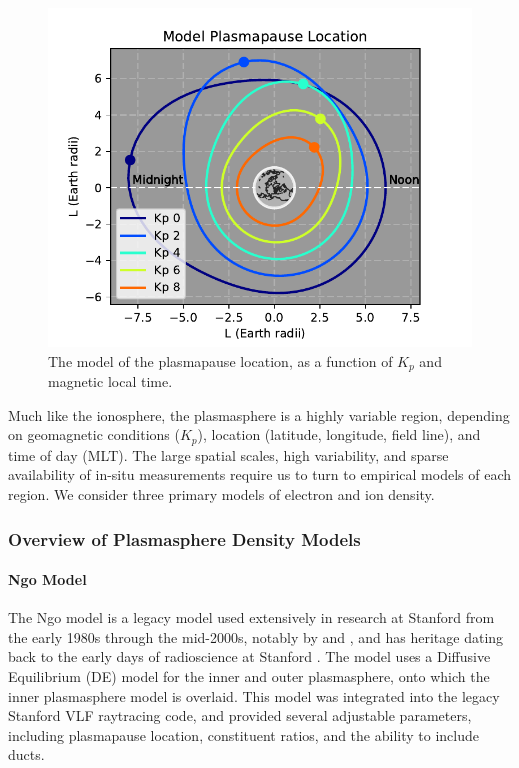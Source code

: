 \begin{figure}[h]
\begin{center}
\includegraphics{figures/plasmapause}
\caption[Model of plasmapause location]{The \cite{Gallagher1999} model of the plasmapause location, as a function of $K_p$ and magnetic local time.}
\label{fig:plasmapause}
\end{center}
\end{figure}


Much like the ionosphere, the plasmasphere is a highly variable region, depending on geomagnetic conditions ($K_p$), location (latitude, longitude, field line), and time of day (MLT). The large spatial scales, high variability, and sparse availability of in-situ measurements require us to turn to empirical models of each region. We consider three primary models of electron and ion density.

\subsubsection{Overview of Plasmasphere Density Models}
\label{section:plasmasphere_density_models}
\paragraph{Ngo Model}

The Ngo model is a legacy model used extensively in research at Stanford from the early 1980s through the mid-2000s, notably by \cite{Lauben1998} and \cite{Bortnik2005}, and has heritage dating back to the early days of radioscience at Stanford \citep{Kimura1966}. The model uses a Diffusive Equilibrium (DE) \citep{Angerami1964} model for the inner and outer plasmasphere, onto which the \cite{Carpenter1992} inner plasmasphere model is overlaid. This model was integrated into the legacy Stanford VLF raytracing code, and provided several adjustable parameters, including plasmapause location, constituent ratios, and the ability to include ducts.

